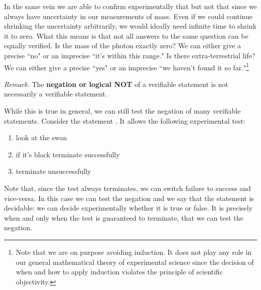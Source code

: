 \documentclass[11pt,letterpaper,fleqn]{memoir} %
\begin{document}
In the same vein we are able to confirm experimentally that  but not that  since we always have uncertainty in our measurements of mass. Even if we could continue shrinking the uncertainty arbitrarily, we would ideally need infinite time to shrink it to zero. What this means is that not all answers to the same question can be equally verified. Is the mass of the photon exactly zero? We can either give a precise ``no" or an imprecise ``it's within this range." Is there extra-terrestrial life? We can either give a precise ``yes" or an imprecise ``we haven't found it so far."\footnote{Note that we are on purpose avoiding induction. It does not play any role in our general mathematical theory of experimental science since the decision of when and how to apply induction violates the principle of scientific objectivity.}

\begin{mathSection}
	\emph{Remark}. The \textbf{negation or logical NOT} of a verifiable statement is not necessarily a verifiable statement.
\end{mathSection}

While this is true in general, we can still test the negation of many verifiable statements. Consider the statement . It allows the following experimental test:
\begin{enumerate}
	\item look at the swan
	\item if it's black terminate successfully
	\item terminate unsuccessfully
\end{enumerate}
Note that, since the test always terminates, we can switch failure to success and vice-versa. In this case we can test the negation and we say that the statement is decidable: we can decide experimentally whether it is true or false. It is precisely when and only when the test is guaranteed to terminate, that we can test the negation.
\end{document}
